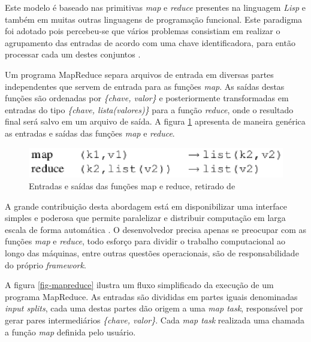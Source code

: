 Este modelo é baseado nas primitivas \textit{map} e \textit{reduce} presentes na linguagem \textit{Lisp} e também em muitas outras linguagens de programação funcional. Este paradigma foi adotado pois percebeu-se que vários problemas consistiam em realizar o agrupamento das entradas de acordo com uma chave identificadora, para então processar cada um destes conjuntos \cite{ghemawatMapreduce2008}.

Um programa MapReduce separa arquivos de entrada em diversas partes independentes que servem de entrada para as funções \textit{map}. As saídas destas funções são ordenadas por \textit{\{chave, valor\}} e posteriormente transformadas em entradas do tipo \textit{\{chave, lista(valores)\}} para a função \textit{reduce}, onde o resultado final será salvo em um arquivo de saída. A figura \ref{fig-mapreduce-io} apresenta de maneira genérica as entradas e saídas das funções \textit{map} e \textit{reduce}.

\begin{figure}[ht!]
	\centering
	\includegraphics[keepaspectratio=true,scale=0.7]
	  {figuras/mapreduce-io.eps}
	\caption{Entradas e saídas das funções map e reduce, retirado de \cite{ghemawatMapreduce2008}}
	\label{fig-mapreduce-io}
\end{figure}

A grande contribuição desta abordagem está em disponibilizar uma interface simples e poderosa que permite paralelizar e distribuir computação em larga escala de forma automática \cite{ghemawatMapreduce2008}. O desenvolvedor precisa apenas se preocupar com as funções \textit{map} e \textit{reduce}, todo esforço para dividir o trabalho computacional ao longo das máquinas, entre outras questões operacionais, são de responsabilidade do próprio \textit{framework}.

A figura \ref{fig-mapreduce} ilustra um fluxo simplificado da execução de um programa MapReduce. As entradas são divididas em partes iguais denominadas \textit{input splits}, cada uma destas partes dão origem a uma \textit{map task}, responsável por gerar pares intermediários \textit{\{chave, valor\}}. Cada \textit{map task} realizada uma chamada a função \textit{map} definida pelo usuário.

